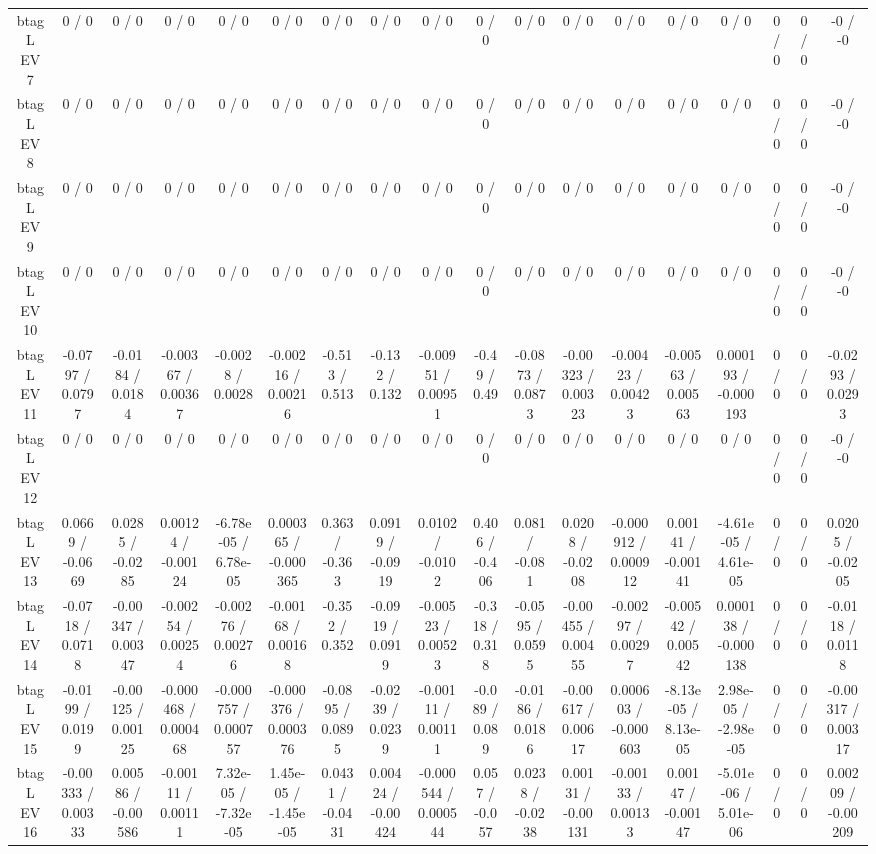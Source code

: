 \documentclass[10pt]{article}
\begin{document}
\begin{table}[htbp]
\begin{center}
\begin{tabular}{|c|c|c|c|c|c|c|c|c|c|c|c|c|c|c|c|c|c|}
  btag L EV 7 & 0 / 0 & 0 / 0 & 0 / 0 & 0 / 0 & 0 / 0 & 0 / 0 & 0 / 0 & 0 / 0 & 0 / 0 & 0 / 0 & 0 / 0 & 0 / 0 & 0 / 0 & 0 / 0 & 0 / 0 & 0 / 0 & -0 / -0 \\ 
  btag L EV 8 & 0 / 0 & 0 / 0 & 0 / 0 & 0 / 0 & 0 / 0 & 0 / 0 & 0 / 0 & 0 / 0 & 0 / 0 & 0 / 0 & 0 / 0 & 0 / 0 & 0 / 0 & 0 / 0 & 0 / 0 & 0 / 0 & -0 / -0 \\ 
  btag L EV 9 & 0 / 0 & 0 / 0 & 0 / 0 & 0 / 0 & 0 / 0 & 0 / 0 & 0 / 0 & 0 / 0 & 0 / 0 & 0 / 0 & 0 / 0 & 0 / 0 & 0 / 0 & 0 / 0 & 0 / 0 & 0 / 0 & -0 / -0 \\ 
  btag L EV 10 & 0 / 0 & 0 / 0 & 0 / 0 & 0 / 0 & 0 / 0 & 0 / 0 & 0 / 0 & 0 / 0 & 0 / 0 & 0 / 0 & 0 / 0 & 0 / 0 & 0 / 0 & 0 / 0 & 0 / 0 & 0 / 0 & -0 / -0 \\ 
  btag L EV 11 & -0.0797 / 0.0797 & -0.0184 / 0.0184 & -0.00367 / 0.00367 & -0.0028 / 0.0028 & -0.00216 / 0.00216 & -0.513 / 0.513 & -0.132 / 0.132 & -0.00951 / 0.00951 & -0.49 / 0.49 & -0.0873 / 0.0873 & -0.00323 / 0.00323 & -0.00423 / 0.00423 & -0.00563 / 0.00563 & 0.000193 / -0.000193 & 0 / 0 & 0 / 0 & -0.0293 / 0.0293 \\ 
  btag L EV 12 & 0 / 0 & 0 / 0 & 0 / 0 & 0 / 0 & 0 / 0 & 0 / 0 & 0 / 0 & 0 / 0 & 0 / 0 & 0 / 0 & 0 / 0 & 0 / 0 & 0 / 0 & 0 / 0 & 0 / 0 & 0 / 0 & -0 / -0 \\ 
  btag L EV 13 & 0.0669 / -0.0669 & 0.0285 / -0.0285 & 0.00124 / -0.00124 & -6.78e-05 / 6.78e-05 & 0.000365 / -0.000365 & 0.363 / -0.363 & 0.0919 / -0.0919 & 0.0102 / -0.0102 & 0.406 / -0.406 & 0.081 / -0.081 & 0.0208 / -0.0208 & -0.000912 / 0.000912 & 0.00141 / -0.00141 & -4.61e-05 / 4.61e-05 & 0 / 0 & 0 / 0 & 0.0205 / -0.0205 \\ 
  btag L EV 14 & -0.0718 / 0.0718 & -0.00347 / 0.00347 & -0.00254 / 0.00254 & -0.00276 / 0.00276 & -0.00168 / 0.00168 & -0.352 / 0.352 & -0.0919 / 0.0919 & -0.00523 / 0.00523 & -0.318 / 0.318 & -0.0595 / 0.0595 & -0.00455 / 0.00455 & -0.00297 / 0.00297 & -0.00542 / 0.00542 & 0.000138 / -0.000138 & 0 / 0 & 0 / 0 & -0.0118 / 0.0118 \\ 
  btag L EV 15 & -0.0199 / 0.0199 & -0.00125 / 0.00125 & -0.000468 / 0.000468 & -0.000757 / 0.000757 & -0.000376 / 0.000376 & -0.0895 / 0.0895 & -0.0239 / 0.0239 & -0.00111 / 0.00111 & -0.089 / 0.089 & -0.0186 / 0.0186 & -0.00617 / 0.00617 & 0.000603 / -0.000603 & -8.13e-05 / 8.13e-05 & 2.98e-05 / -2.98e-05 & 0 / 0 & 0 / 0 & -0.00317 / 0.00317 \\ 
  btag L EV 16 & -0.00333 / 0.00333 & 0.00586 / -0.00586 & -0.00111 / 0.00111 & 7.32e-05 / -7.32e-05 & 1.45e-05 / -1.45e-05 & 0.0431 / -0.0431 & 0.00424 / -0.00424 & -0.000544 / 0.000544 & 0.057 / -0.057 & 0.0238 / -0.0238 & 0.00131 / -0.00131 & -0.00133 / 0.00133 & 0.00147 / -0.00147 & -5.01e-06 / 5.01e-06 & 0 / 0 & 0 / 0 & 0.00209 / -0.00209 \\ 

\end{tabular}
\end{center}
\end{table}
\end{document}
